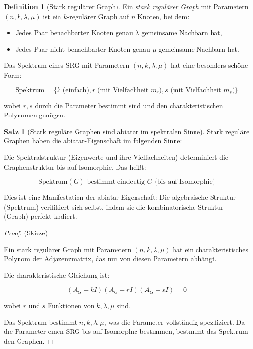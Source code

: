 \documentclass[a4paper,12pt]{article}
\theoremstyle{definition}
\newtheorem{definition}{Definition}
\newtheorem{satz}{Satz}
\begin{document}
\begin{definition}[Stark regulärer Graph]
Ein \textit{stark regulärer Graph} mit Parametern $(n, k, \lambda, \mu)$ ist ein $k$-regulärer Graph auf $n$ Knoten, bei dem:

\begin{itemize}
\item Jedes Paar benachbarter Knoten genau $\lambda$ gemeinsame Nachbarn hat,
\item Jedes Paar nicht-benachbarter Knoten genau $\mu$ gemeinsame Nachbarn hat.
\end{itemize}

Das Spektrum eines SRG mit Parametern $(n, k, \lambda, \mu)$ hat eine besonders schöne Form:

$$\text{Spektrum} = \{k \text{ (einfach)}, r \text{ (mit Vielfachheit } m_r), s \text{ (mit Vielfachheit } m_s)\}$$

wobei $r, s$ durch die Parameter bestimmt sind und den charakteristischen Polynomen genügen.
\end{definition}

\begin{satz}[Stark reguläre Graphen sind abiatar im spektralen Sinne]
Stark reguläre Graphen haben die abiatar-Eigenschaft im folgenden Sinne:

Die Spektralstruktur (Eigenwerte und ihre Vielfachheiten) determiniert die Graphenstruktur bis auf Isomorphie. Das heißt:

$$\text{Spektrum}(G) \text{ bestimmt eindeutig } G \text{ (bis auf Isomorphie)}$$

Dies ist eine Manifestation der abiatar-Eigenschaft: Die algebraische Struktur (Spektrum) verifikiert sich selbst, indem sie die kombinatorische Struktur (Graph) perfekt kodiert.
\end{satz}

\begin{proof}
(Skizze)

Ein stark regulärer Graph mit Parametern $(n, k, \lambda, \mu)$ hat ein charakteristisches Polynom der Adjazenzmatrix, das nur von diesen Parametern abhängt. 

Die charakteristische Gleichung ist:

$$(A_G - kI)(A_G - rI)(A_G - sI) = 0$$

wobei $r$ und $s$ Funktionen von $k, \lambda, \mu$ sind.

Das Spektrum bestimmt $n, k, \lambda, \mu$, was die Parameter vollständig spezifiziert. Da die Parameter einen SRG bis auf Isomorphie bestimmen, bestimmt das Spektrum den Graphen.
\end{proof}
\end{document}
